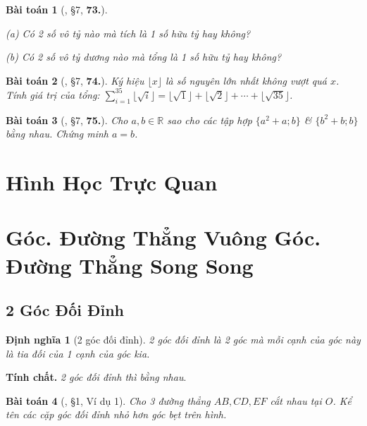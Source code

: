 \documentclass{article}
\numberwithin{equation}{section}
\newtheorem{dinhnghia}{Định nghĩa}[section]
\newtheorem{baitoan}{Bài toán}[section]
\begin{document}
\begin{baitoan}[\cite{Binh_Toan_7_tap_1}, \S7, \textbf{73.}]
	\begin{enumerate*}
		\item[(a)] Có 2 số vô tỷ nào mà tích là 1 số hữu tỷ hay không?
		\item[(b)] Có 2 số vô tỷ dương nào mà tổng là 1 số hữu tỷ hay không?
	\end{enumerate*}
\end{baitoan}

\begin{baitoan}[\cite{Binh_Toan_7_tap_1}, \S7, \textbf{74.}]
	Ký hiệu $\lfloor x\rfloor$ là số nguyên lớn nhất không vượt quá $x$. Tính giá trị của tổng: $\sum_{i=1}^{35} \lfloor\sqrt{i}\rfloor = \lfloor\sqrt{1}\rfloor + \lfloor\sqrt{2}\rfloor + \cdots + \lfloor\sqrt{35}\rfloor$.
\end{baitoan}

\begin{baitoan}[\cite{Binh_Toan_7_tap_1}, \S7, \textbf{75.}]
	Cho $a,b\in\mathbb{R}$ sao cho các tập hợp $\{a^2 + a;b\}$ \& $\{b^2 + b;b\}$ bằng nhau. Chứng minh $a = b$.
\end{baitoan}


\section{Hình Học Trực Quan}


\section{Góc. Đường Thẳng Vuông Góc. Đường Thẳng Song Song}

\subsection{2 Góc Đối Đỉnh}

\begin{dinhnghia}[2 góc đối đỉnh]
	\emph{2 góc đối đỉnh} là 2 góc mà mỗi cạnh của góc này là tia đối của 1 cạnh của góc kia.
\end{dinhnghia}
\textbf{Tính chất.} \textit{2 góc đối đỉnh thì bằng nhau}.

\begin{baitoan}[\cite{Binh_Toan_7_tap_1}, \S1, Ví dụ 1]
	Cho 3 đường thẳng $AB,CD,EF$ cắt nhau tại $O$. Kể tên các cặp góc đối đỉnh nhỏ hơn  góc bẹt trên hình.
\end{baitoan}
\end{document}
